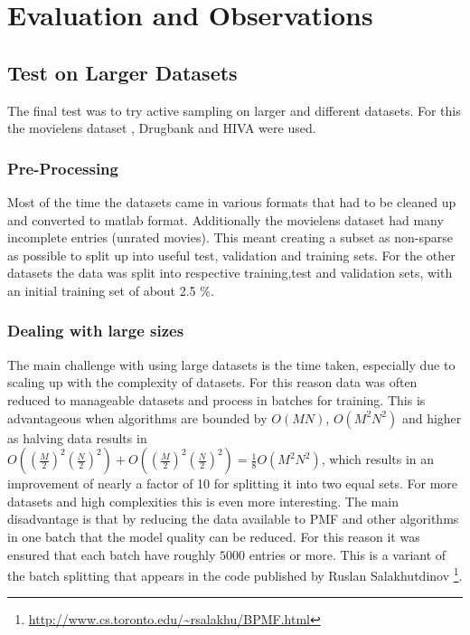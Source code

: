 \chapter{Evaluation and Observations}
\ifpdf
    \graphicspath{{Chapter4/Chapter4Figs/PNG/}{Chapter4/Chapter4Figs/PDF/}{Chapter4/Chapter4Figs/}}
\else
    \graphicspath{{Chapter4/Chapter4Figs/EPS/}{Chapter4/Chapter4Figs/}}
\fi

\section{Test on Larger Datasets}
The final test was to try active sampling on larger and different datasets. For this the movielens dataset \cite{movielensdata}, Drugbank \cite{law2014drugbank} and HIVA \cite{hivadata} were used.
\subsection{Pre-Processing}
Most of the time the datasets came in various formats that had to be cleaned up and converted to matlab format. Additionally the movielens dataset had many incomplete entries (unrated movies). This meant creating a subset as non-sparse as possible to split up into useful test, validation and training sets. For the other datasets the data was split into respective training,test and validation sets, with an initial training set of about 2.5 \%.


\subsection{Dealing with large sizes}

The main challenge with using large datasets is the time taken, especially due to scaling up with the complexity of datasets. For this reason data was often reduced to manageable datasets and process in batches for training. This is advantageous when algorithms are bounded by $O(MN)$, $O(M^2N^2)$ and higher as halving data results in $O(\left(\frac{M}{2}\right)^2 \left(\frac{N}{2}\right)^2)+ O(\left(\frac{M}{2}\right)^2 \left(\frac{N}{2}\right)^2) = \frac{1}{8}O(M^2 N^2)$, which results in an improvement of nearly a factor of 10 for splitting it into two equal sets. For more datasets and high complexities this is even more interesting. The main disadvantage is that by reducing the data available to PMF and other algorithms in one batch that the model quality can be reduced. For this reason it was ensured that each batch have roughly $5000$ entries or more. This is a variant of the batch splitting that appears in the code published by Ruslan Salakhutdinov\cite{SalMnih2008} \footnote{\url{http://www.cs.toronto.edu/~rsalakhu/BPMF.html}}.
